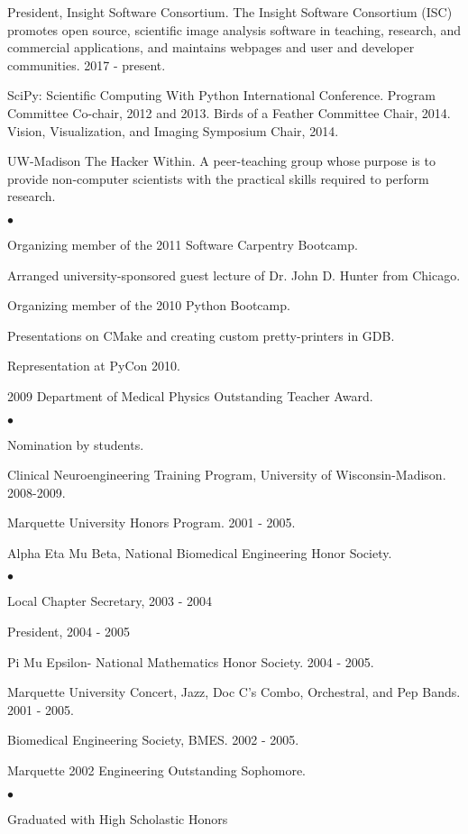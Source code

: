 \documentclass[margin,line]{res}
\newenvironment{list2}{
  \begin{list}{$\bullet$}{%
      \setlength{\itemsep}{0in}
      \setlength{\parsep}{0in} \setlength{\parskip}{0in}
      \setlength{\topsep}{0in} \setlength{\partopsep}{0in}
      \setlength{\leftmargin}{0.2in}}}{\end{list}}
\begin{document}
\begin{resume}
President, Insight Software Consortium.
The Insight Software Consortium (ISC) promotes open source, scientific image analysis software in teaching, research, and commercial applications, and maintains webpages and user and developer communities.
2017 - present.

SciPy: Scientific Computing With Python International Conference.  Program
Committee Co-chair, 2012 and 2013. Birds of a Feather Committee Chair, 2014.
Vision, Visualization, and Imaging Symposium Chair, 2014.

UW-Madison The Hacker Within.  A peer-teaching group whose purpose is to provide
non-computer scientists with the practical skills required to perform research.
\begin{list2}
\item Organizing member of the 2011 Software Carpentry Bootcamp.
\item Arranged university-sponsored guest lecture of Dr. John D. Hunter from Chicago.
\item Organizing member of the 2010 Python Bootcamp.
\item Presentations on CMake and creating custom pretty-printers in GDB.
\item Representation at PyCon 2010.
\end{list2}

2009 Department of Medical Physics Outstanding Teacher Award.
\begin{list2}
\item  Nomination by students.
\end{list2}

Clinical Neuroengineering Training Program, University of Wisconsin-Madison.
2008-2009.

Marquette University Honors Program. 2001 - 2005.

Alpha Eta Mu Beta, National Biomedical Engineering Honor Society.
\begin{list2}
 \item Local Chapter Secretary, 2003 - 2004
 \item President, 2004 - 2005
\end{list2}

Pi Mu Epsilon- National Mathematics Honor Society. 2004 - 2005.

Marquette University Concert, Jazz, Doc C's Combo, Orchestral, and Pep Bands.
2001 - 2005.

Biomedical Engineering Society, BMES. 2002 - 2005.

Marquette 2002 Engineering Outstanding Sophomore.
\begin{list2}
\item Graduated with High Scholastic Honors
\end{list2}


\end{resume}
\end{document}
